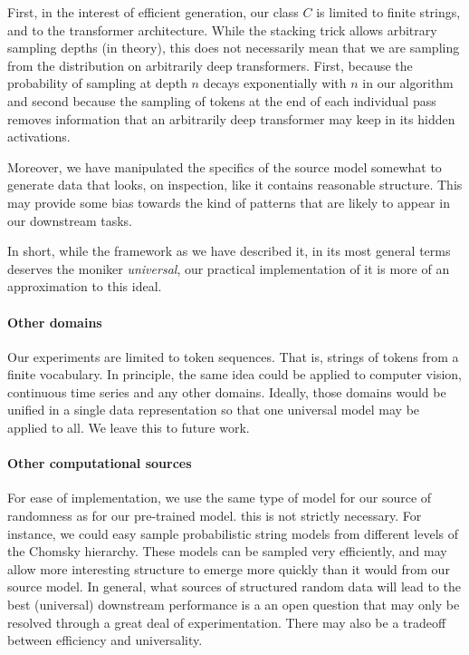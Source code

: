 \documentclass{article} %
\begin{document}
First, in the interest of efficient generation, our class $C$ is limited to finite strings, and to the transformer architecture. While the stacking trick allows arbitrary sampling depths (in theory), this does not necessarily mean that we are sampling from the distribution on arbitrarily deep transformers. First, because the probability of sampling at depth $n$ decays exponentially with $n$ in our algorithm and second because the sampling of tokens at the end of each individual pass removes information that an arbitrarily deep transformer may keep in its hidden activations. 

Moreover, we have manipulated the specifics of the source model somewhat to generate data that looks, on inspection, like it contains reasonable structure. This may provide some bias towards the kind of patterns that are likely to appear in our downstream tasks. 

In short, while the framework as we have described it, in its most general terms deserves the moniker \emph{universal}, our practical implementation of it is more of an approximation to this ideal.

\paragraph{Other domains} Our experiments are limited to token sequences. That is, strings of tokens from a finite vocabulary. In principle, the same idea could be applied to computer vision, continuous time series and any other domains. Ideally, those domains would be unified in a single data representation so that one universal model may be applied to all. We leave this to future work.

\paragraph{Other computational sources} For ease of implementation, we use the same type of model for our source of randomness as for our pre-trained model. this is not strictly necessary. For instance, we could easy sample probabilistic string models from different levels of the Chomsky hierarchy. These models can be sampled very efficiently, and may allow more interesting structure to emerge more quickly than it would from our source model. In general, what sources of structured random data will lead to the best (universal) downstream performance is a an open question that may only be resolved through a great deal of experimentation. There may also be a tradeoff between efficiency and universality. 
\end{document}
